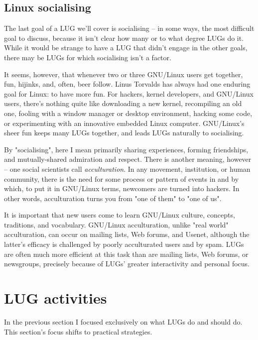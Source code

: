 \documentclass{HOWTO}
\begin{document}
\subsection{Linux socialising}

The last goal of a LUG we'll cover is socialising -- in some ways,
the most difficult goal to discuss, because it isn't clear how
many or to what degree LUGs do it. While it would be strange to
have a LUG that didn't engage in the other goals, there may be
LUGs for which socialising isn't a factor.

It seems, however, that whenever two or three GNU/Linux users get together,
fun, hijinks, and, often, beer follow. Linus Torvalds has
always had one enduring goal for Linux: to have more fun. For hackers,
kernel developers, and GNU/Linux users, there's nothing quite like
downloading a new kernel, recompiling an old one, fooling with a
window manager or desktop environment, hacking some code, or experimenting
with an innovative embedded Linux computer. GNU/Linux's sheer fun keeps many
LUGs together, and leads LUGs naturally to socialising.

By "socialising", here I mean primarily sharing experiences, forming
friendships, and mutually-shared admiration and respect. There is
another meaning, however -- one social scientists call
{\itshape acculturation\/}. In any movement, institution, or human
community, there is the need for some process or pattern of events in
and by which, to put it in GNU/Linux terms, newcomers are turned into
hackers. In other words, acculturation turns you from "one of them" to
"one of us".

It is important that new users come to learn GNU/Linux culture,
concepts, traditions, and vocabulary.  GNU/Linux acculturation, unlike "real
world" acculturation, can occur on mailing lists, Web forums, and
Usenet, although the latter's efficacy is challenged by poorly
acculturated users and by spam. LUGs are often much more efficient at
this task than are mailing lists, Web forums, or newsgroups, precisely
because of LUGs' greater interactivity and personal focus.




\section{LUG activities}

In the previous section I focused exclusively on what LUGs do and 
should do. This section's focus shifts to practical strategies.
\end{document}
